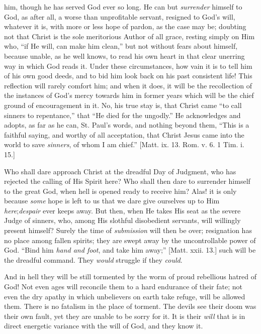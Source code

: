 him, though he has served God ever so long. He can but \emph{surrender}
himself to God, as after all, a worse than unprofitable servant,
resigned to God's will, whatever it is, with more or less hope of
pardon, as the case may be; doubting not that Christ is the sole
meritorious Author of all grace, resting simply on Him who, ``if
He will, can make him clean,'' but not without fears about
himself, because unable, as he well knows, to read his own heart in
that clear unerring way in which God reads it. Under these
circumstances, how vain it is to tell him of his own good deeds, and
to bid him look back on his past consistent life! This reflection will
rarely comfort him; and when it does, it will be the recollection of
the instances of God's mercy towards him in former years which will be
the chief ground of encouragement in it. No, his true stay is, that
Christ came ``to call sinners to repentance,'' that ``He
died for the ungodly.'' He acknowledges and adopts, as far as he
can, St. Paul's words, and nothing beyond them, ``This is a
faithful saying, and worthy of all acceptation, that Christ Jesus came
into the world to save \emph{sinners}, of whom I am chief.''
[Matt. ix. 13. Rom. v. 6. 1 Tim. i. 15.]

Who shall dare approach Christ at the dreadful Day of Judgment, who
has rejected the calling of His Spirit here? Who shall then dare to
surrender himself to the great God, when hell is opened ready to
receive him? Alas! it is only because \emph{some} hope is left to us
that we dare give ourselves up to Him \emph{here};\emph{despair} ever
keeps away. But then, when He takes His seat as the severe Judge of
sinners, who, among His slothful disobedient servants, will willingly
present himself? Surely the time of \emph{submission} will then be
over; resignation has no place among fallen spirits; they are swept
away by the uncontrollable power of God. ``Bind him \emph{hand and
foot}, and take him away;'' [Matt. xxii. 13.] such will be the
dreadful command. They \emph{would} struggle if they \emph{could}.

And in hell they will be still tormented by the worm of proud
rebellious hatred of God! Not even ages will reconcile them to a hard
endurance of their fate; not even the dry apathy in which unbelievers
on earth take refuge, will be allowed them. There is no fatalism in
the place of torment. The devils see their doom was their own fault,
yet they are unable to be sorry for it. It is their \emph{will} that
is in direct energetic variance with the will of God, and they know
it.

